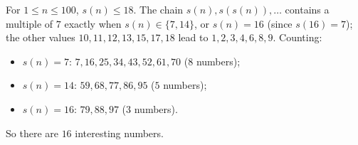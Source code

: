 For $1\le n\le100$, $s(n)\le18$. The chain $s(n),s(s(n)),\dots$ contains a multiple of $7$ exactly when $s(n)\in\{7,14\}$, or $s(n)=16$ (since $s(16)=7$); the other values $10,11,12,13,15,17,18$ lead to $1,2,3,4,6,8,9$. Counting:
\begin{itemize}
\item $s(n)=7$: $7,16,25,34,43,52,61,70$ ($8$ numbers);
\item $s(n)=14$: $59,68,77,86,95$ ($5$ numbers);
\item $s(n)=16$: $79,88,97$ ($3$ numbers).
\end{itemize}
So there are $\boxed{16}$ interesting numbers.
